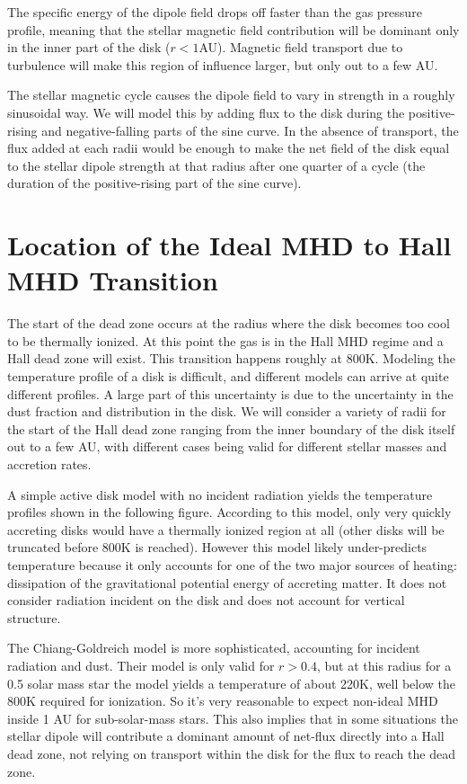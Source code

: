 The specific energy of the dipole field drops off faster than the gas pressure profile, meaning that the stellar magnetic field contribution will be dominant only in the inner part of the disk ($r<1$AU).  Magnetic field transport due to turbulence will make this region of influence larger, but only out to a few AU.

The stellar magnetic cycle causes the dipole field to vary in strength in a roughly sinusoidal way.  We will model this by adding flux to the disk during the positive-rising and negative-falling parts of the sine curve.  In the absence of transport, the flux added at each radii would be enough to make the net field of the disk equal to the stellar dipole strength at that radius after one quarter of a cycle (the duration of the positive-rising part of the sine curve).    




\newpage
\section{Location of the Ideal MHD to Hall MHD Transition}
The start of the dead zone occurs at the radius where the disk becomes too cool to be thermally ionized.  At this point the gas is in the Hall MHD regime and a Hall dead zone will exist.  This transition happens roughly at 800K.  Modeling the temperature profile of a disk is difficult, and different models can arrive at quite different profiles.  A large part of this uncertainty is due to the uncertainty in the dust fraction and distribution in the disk.  We will consider a variety of radii for the start of the Hall dead zone ranging from the inner boundary of the disk itself out to a few AU, with different cases being valid for different stellar masses and accretion rates.        

A simple active disk model with no incident radiation yields the temperature profiles shown in the following figure.  According to this model, only very quickly accreting disks would have a thermally ionized region at all (other disks will be truncated before 800K is reached).  However this model likely under-predicts temperature because it only accounts for one of the two major sources of heating: dissipation of the gravitational potential energy of accreting matter.  It does not consider radiation incident on the disk and does not account for vertical structure. 

The Chiang-Goldreich model is more sophisticated, accounting for incident radiation and dust.  Their model is only valid for $r>0.4$, but at this radius for a 0.5 solar mass star the model yields a temperature of about 220K, well below the 800K required for ionization.  So it's very reasonable to expect non-ideal MHD inside 1 AU for sub-solar-mass stars.  This also implies that in some situations the stellar dipole will contribute a dominant amount of net-flux directly into a Hall dead zone, not relying on transport within the disk for the flux to reach the dead zone.

